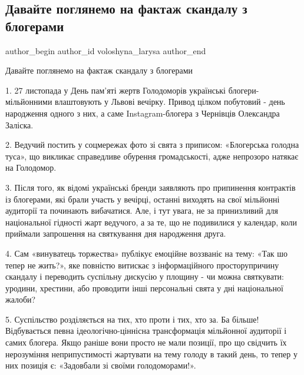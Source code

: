  
 
 
 
 
 
\subsection{Давайте поглянемо на фактаж скандалу з блогерами}
\label{sec:30_11_2021.fb.voloshyna_larysa.1.skandal_bloggery_golodomor}
 
\ifcmt
 author_begin
   author_id voloshyna_larysa
 author_end
\fi

Давайте поглянемо на фактаж скандалу з блогерами

1. 27 листопада у День пам’яті жертв Голодоморів українські блогери-мільйонними
влаштовують у Львові вечірку. Привод цілком побутовий - день народження одного
з них, а саме Instagram-блогера з Чернівців Олександра Заліска.

2. Ведучий постить у соцмережах фото зі свята з приписом: «Блогерська голодна
туса», що викликає справедливе обурення громадськості, адже непрозоро натякає
на Голодомор. 

3. Після того, як відомі українські бренди заявляють про припинення контрактів
із блогерами, які брали участь у вечірці, останні виходять на свої мільйонні
аудиторії та починають вибачатися. Але, і тут увага, не за принизливий для
національної гідності жарт ведучого, а за те, що не подивилися у календар, коли
приймали запрошення на святкування дня народження друга.

4. Сам «винуватець торжества» публікує емоційне воззваніє на тему: «Так шо
тепер не жить?», яке повністю витискає з інформаційного просторупричину
скандалу і переводить суспільну дискусію у площину - чи можна святкувати:
уродини, хрестини, або проводити інші персональні свята у дні національної
жалоби? 

5. Суспільство розділяється на тих, хто проти і тих, хто за. Ба більше!
Відбувається певна ідеологічно-ціннісна трансформація мільйонної аудиторії і
самих блогера. Якщо раніше вони просто не мали позиції, про що свідчить їх
нерозуміння неприпустимості жартувати на тему голоду в такий день, то тепер у
них позиція є: «Задовбали зі своїми голодоморами!».  

